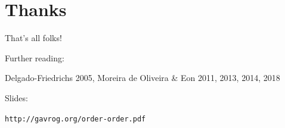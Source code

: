 \documentclass{beamer}
\begin{document}
\section{Thanks}

\begin{frame}
  \begin{center}
    \Huge

    That's all folks!

    \bigskip

    \tiny

    Further reading:

    Delgado-Friedrichs 2005, Moreira de Oliveira \& Eon 2011, 2013, 2014, 2018

    \bigskip

    Slides:

    {\tt http://gavrog.org/order-order.pdf}
  \end{center}
\end{frame}
\end{document}
